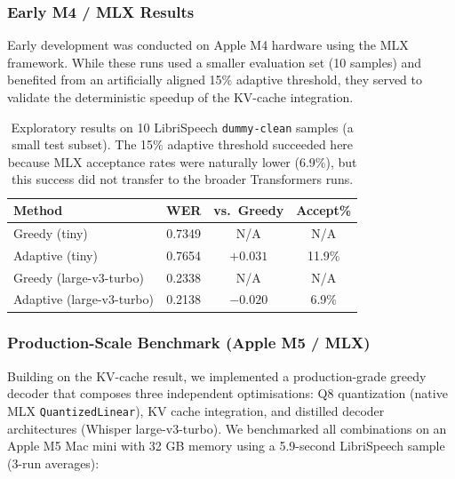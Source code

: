 \documentclass[11pt,a4paper]{article}
\begin{document}
\subsubsection{Early M4 / MLX Results}

Early development was conducted on Apple M4 hardware using the MLX framework. While these runs used a smaller evaluation set (10 samples) and benefited from an artificially aligned 15\% adaptive threshold, they served to validate the deterministic speedup of the KV-cache integration.

\begin{table}[H]
\centering
\small
\begin{tabular}{@{}lccc@{}}
\toprule
\textbf{Method} & \textbf{WER} & \textbf{vs.\ Greedy} & \textbf{Accept\%} \\
\midrule
Greedy (tiny) & 0.7349 & N/A & N/A \\
Adaptive (tiny) & 0.7654 & $+0.031$ & 11.9\% \\
\midrule
Greedy (large-v3-turbo) & 0.2338 & N/A & N/A \\
Adaptive (large-v3-turbo) & 0.2138 & $-0.020$ & 6.9\% \\
\bottomrule
\end{tabular}
\caption{Exploratory results on 10 LibriSpeech \texttt{dummy-clean} samples (a small test subset). The 15\% adaptive threshold succeeded here because MLX acceptance rates were naturally lower (6.9\%), but this success did not transfer to the broader Transformers runs.}
\label{tab:mlx_exploratory}
\end{table}

\subsubsection{Production-Scale Benchmark (Apple M5 / MLX)}

Building on the KV-cache result, we implemented a production-grade greedy decoder that composes three independent optimisations: Q8 quantization (native MLX \texttt{QuantizedLinear}), KV cache integration, and distilled decoder architectures (Whisper large-v3-turbo). We benchmarked all combinations on an Apple M5 Mac mini with 32 GB memory using a 5.9-second LibriSpeech sample (3-run averages):
\end{document}
